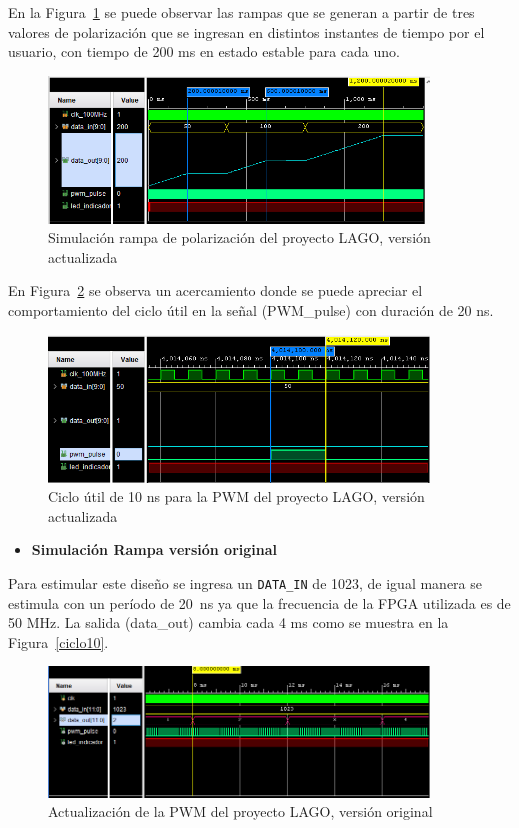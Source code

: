 En la Figura~\ref{10ns} se puede observar las rampas que se generan a partir de tres valores de polarización que se ingresan en distintos instantes de tiempo por el usuario, con tiempo de 200 ms en estado estable para cada uno.

\begin{figure}[H]
\includegraphics[width=0.9\textwidth]{Figs/Rampa_100Mhz.PNG} 
\centering
\caption{Simulación rampa de polarización del proyecto LAGO, versión actualizada}
\label{10ns}
\end{figure}
En Figura~\ref{10ns2} se observa un acercamiento donde se puede apreciar el comportamiento del ciclo útil en la señal (PWM\_pulse) con duración de 20 ns.


\begin{figure}[H]
\includegraphics[width=0.9\textwidth]{Figs/zomnuevo.PNG} \centering
\caption{Ciclo útil de 10 ns para la PWM del proyecto LAGO, versión actualizada}
\label{10ns2}
\end{figure}


\begin{itemize}
    \item {\textbf{Simulación Rampa versión original}}
\end{itemize}

Para estimular este diseño se ingresa un \texttt{DATA\_IN} de 1023, de igual manera se estimula con un período de 20~ns ya que la frecuencia de la FPGA utilizada es de 50 MHz.
La salida (data\_out) cambia cada 4 ms como se muestra en la Figura~\ref{ciclo10}.

\begin{figure}[H]
\includegraphics[width=0.9\textwidth]{Figs/pwmoriginal.PNG} 
\centering
\caption{Actualización de la PWM del proyecto LAGO, versión original}
\label{actualizacionac}
\end{figure}

